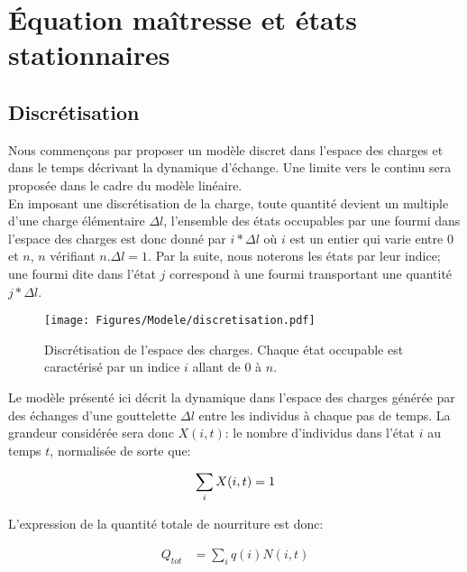 \chapter{Équation maîtresse et états stationnaires}

\section{Discrétisation}

Nous commençons par proposer un modèle discret dans l'espace des charges et dans le temps décrivant la dynamique d'échange. Une limite vers le continu sera proposée dans le cadre du modèle linéaire.\\

En imposant une discrétisation de la charge, toute quantité devient un multiple d'une charge élémentaire $\Delta l$, l'ensemble des états occupables par une fourmi dans l'espace des charges est donc donné par $i*\Delta l$ où $i$ est un entier qui varie entre $0$ et $n$, $n$ vérifiant $n.\Delta l = 1$. Par la suite, nous noterons les états par leur indice; une fourmi dite dans l'état $j$ correspond à une fourmi transportant une quantité $j* \Delta l$.\\

\begin{figure}[h]
\centering
\texttt{[image: Figures/Modele/discretisation.pdf]}
\caption{Discrétisation de l'espace des charges. Chaque état occupable est caractérisé par un indice $i$ allant de $0$ à $n$.}
\label{discretisation}
\end{figure}


Le modèle présenté ici décrit la dynamique dans l'espace des charges générée par des échanges d'une gouttelette $\Delta l$ entre les individus à chaque pas de temps. La grandeur considérée sera donc $X(i,t)$: le nombre d'individus dans l'état $i$ au temps $t$, normalisée de sorte que:

\begin{equation}
\sum_i X(i,t)=1\\
\end{equation}

L'expression de la quantité totale de nourriture est donc:

\begin{equation}
\begin{aligned}
Q_{tot}	&= \sum_i q(i) N(i,t) \\
\end{aligned}
\end{equation}

